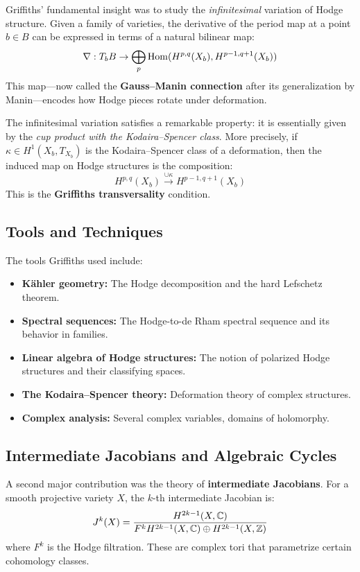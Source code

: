 Griffiths' fundamental insight was to study the \textit{infinitesimal} variation of Hodge structure. Given a family of varieties, the derivative of the period map at a point $b \in B$ can be expressed in terms of a natural bilinear map:
\[
\nabla: T_b B \to \bigoplus_p \operatorname{Hom}(H^{p,q}(X_b), H^{p-1,q+1}(X_b))
\]
This map---now called the \textbf{Gauss--Manin connection} after its generalization by Manin---encodes how Hodge pieces rotate under deformation.

The infinitesimal variation satisfies a remarkable property: it is essentially given by the \textit{cup product with the Kodaira--Spencer class}. More precisely, if $\kappa \in H^1(X_b, T_{X_b})$ is the Kodaira--Spencer class of a deformation, then the induced map on Hodge structures is the composition:
\[
H^{p,q}(X_b) \xrightarrow{\cup \kappa} H^{p-1,q+1}(X_b)
\]
This is the \textbf{Griffiths transversality} condition.

\subsection{Tools and Techniques}

The tools Griffiths used include:
\begin{itemize}
    \item \textbf{K\"ahler geometry:} The Hodge decomposition and the hard Lefschetz theorem.
    \item \textbf{Spectral sequences:} The Hodge-to-de Rham spectral sequence and its behavior in families.
    \item \textbf{Linear algebra of Hodge structures:} The notion of polarized Hodge structures and their classifying spaces.
    \item \textbf{The Kodaira--Spencer theory:} Deformation theory of complex structures.
    \item \textbf{Complex analysis:} Several complex variables, domains of holomorphy.
\end{itemize}

\subsection{Intermediate Jacobians and Algebraic Cycles}

A second major contribution was the theory of \textbf{intermediate Jacobians}. For a smooth projective variety $X$, the $k$-th intermediate Jacobian is:
\[
J^k(X) = \frac{H^{2k-1}(X, \mathbb{C})}{F^k H^{2k-1}(X, \mathbb{C}) \oplus H^{2k-1}(X, \mathbb{Z})}
\]
where $F^k$ is the Hodge filtration. These are complex tori that parametrize certain cohomology classes.

